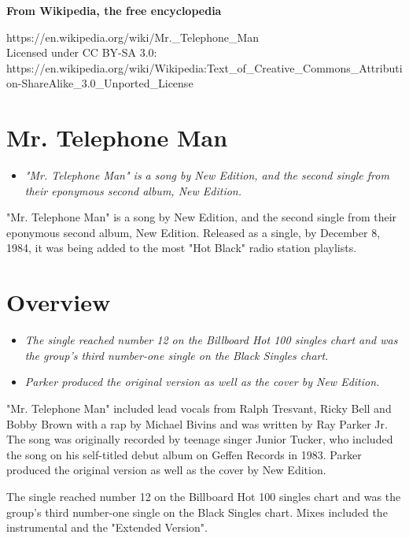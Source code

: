 \textbf{From Wikipedia, the free encyclopedia}

https://en.wikipedia.org/wiki/Mr.\_Telephone\_Man\\
Licensed under CC BY-SA 3.0:\\
https://en.wikipedia.org/wiki/Wikipedia:Text\_of\_Creative\_Commons\_Attribution-ShareAlike\_3.0\_Unported\_License

\section{Mr. Telephone Man}\label{mr.-telephone-man}

\begin{itemize}
\item
  \emph{"Mr. Telephone Man" is a song by New Edition, and the second
  single from their eponymous second album, New Edition.}
\end{itemize}

"Mr. Telephone Man" is a song by New Edition, and the second single from
their eponymous second album, New Edition. Released as a single, by
December 8, 1984, it was being added to the most "Hot Black" radio
station playlists.

\section{Overview}\label{overview}

\begin{itemize}
\item
  \emph{The single reached number 12 on the Billboard Hot 100 singles
  chart and was the group's third number-one single on the Black Singles
  chart.}
\item
  \emph{Parker produced the original version as well as the cover by New
  Edition.}
\end{itemize}

"Mr. Telephone Man" included lead vocals from Ralph Tresvant, Ricky Bell
and Bobby Brown with a rap by Michael Bivins and was written by Ray
Parker Jr. The song was originally recorded by teenage singer Junior
Tucker, who included the song on his self-titled debut album on Geffen
Records in 1983. Parker produced the original version as well as the
cover by New Edition.

The single reached number 12 on the Billboard Hot 100 singles chart and
was the group's third number-one single on the Black Singles chart.
Mixes included the instrumental and the "Extended Version".

